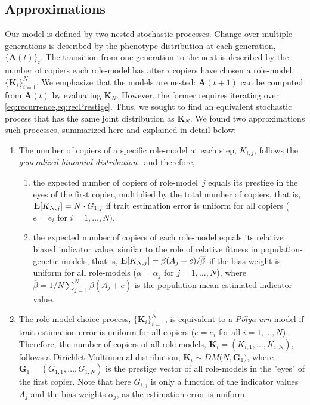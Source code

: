 \documentclass[12pt]{extarticle}
\DeclareMathOperator*{\E}{{\rm I\kern-.3em E}}
\let\vec\mathbf
\begin{document}
\subsection*{Approximations}
Our model is defined by two nested stochastic processes. Change over multiple generations is described by the phenotype distribution at each generation, $\{\vec{A}(t)\}_t$. The transition from one generation to the next is described by the number of copiers each role-model has after $i$ copiers have chosen a role-model, $\{\vec{K}_i\}_{i=1}^N$.
We emphasize that the models are nested: $\vec{A}(t+1)$ can be computed from $\vec{A}(t)$ by evaluating $\vec{K}_{N}$. However, the former requires iterating over \cref{eq:recurrence,eq:recPrestige}. Thus, we sought to find an equivalent stochastic process that has the same joint distribution as $\vec{K}_{N}$. 
We found two approximations such processes, summarized here and explained in detail below:
\begin{enumerate}
\item 
The number of copiers of a specific role-model at each step, $K_{i,j}$, follows the {\em generalized binomial distribution}~\citep{GBD} and therefore,
\begin{enumerate}\item the expected number of copiers of role-model~$j$ equals its prestige in the eyes of the first copier, multiplied by the total number of copiers, that is,
$\E[K_{N,j}] = N \cdot G_{1,j}$ if trait estimation error is uniform for all copiers ($e=e_i$ for $i=1, \ldots, N$).
\item the expected number of copiers of each role-model equals its relative biased indicator value, similar to the role of relative fitness in population-genetic models, that is, $\E[K_{N,j}] = \beta(A_j+e) / \overline{\beta}$ if the bias weight is uniform for all role-models ($\alpha=\alpha_j$ for $j=1,\ldots,N$), where $\overline{\beta}=1/N \sum_{j=1}^{N}{\beta(A_j+e)}$ is the population mean estimated indicator value. 
\end{enumerate}
\item The role-model choice process, $\{\vec{K}_{i}\}_{i=1}^{N}$, is equivalent to a {\em P\'{o}lya urn} model if trait estimation error is uniform for all copiers ($e=e_i$ for all $i=1, \ldots, N$). 
Therefore, the number of copiers of all role-models, $\vec{K}_i = (K_{i,1}, \ldots, K_{i,N})$, follows a Dirichlet-Multinomial distribution,
$\vec{K}_i \sim \mathit{DM}\big(N, \vec{G}_1\big)$, where $\vec{G}_1 = (G_{1,1}, \ldots, G_{1,N})$ is the prestige vector of all role-models in the "eyes" of the first copier.
Note that here $G_{i,j}$ is only a function of the indicator values $A_j$ and the bias weights $\alpha_j$, as the estimation error is uniform. %
\end{enumerate}
\end{document}
